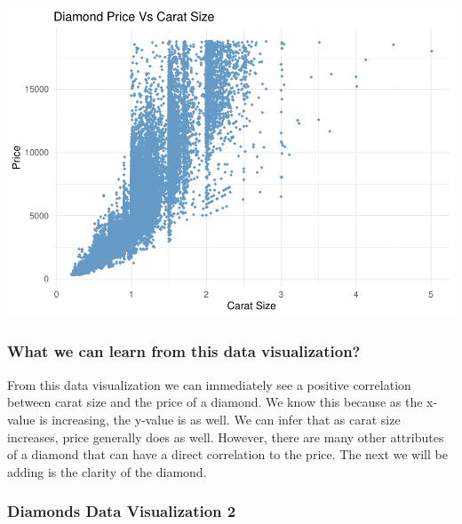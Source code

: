 \documentclass[
]{article}
\begin{document}
\includegraphics{Activity-8-_files/figure-latex/Diamonds - Price vs Carat Size-1.pdf}

\hypertarget{what-we-can-learn-from-this-data-visualization}{%
\subsubsection{What we can learn from this data
visualization?}\label{what-we-can-learn-from-this-data-visualization}}

From this data visualization we can immediately see a positive
correlation between carat size and the price of a diamond. We know this
because as the x-value is increasing, the y-value is as well. We can
infer that as carat size increases, price generally does as well.
However, there are many other attributes of a diamond that can have a
direct correlation to the price. The next we will be adding is the
clarity of the diamond.

\hypertarget{diamonds-data-visualization-2}{%
\subsubsection{Diamonds Data Visualization
2}\label{diamonds-data-visualization-2}}
\end{document}
